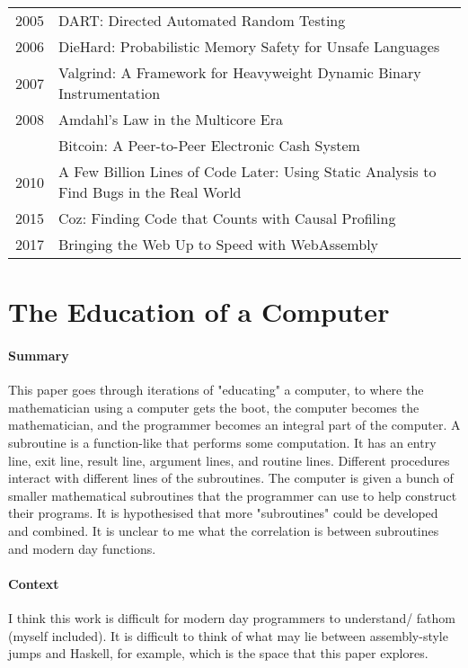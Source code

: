 {\begin{tabular}{r |@{\foo} l}
2005 & DART: Directed Automated Random Testing \cite{godefroid2005dart} \\
2006 & DieHard: Probabilistic Memory Safety for Unsafe Languages \cite{berger2006diehard} \\
2007 & Valgrind: A Framework for Heavyweight Dynamic Binary Instrumentation \cite{nethercote2007valgrind} \\
2008 & Amdahl’s Law in the Multicore Era \cite{hill2008amdahl} \\
     & Bitcoin: A Peer-to-Peer Electronic Cash System \cite{nakamoto2008bitcoin} \\
2010 & A Few Billion Lines of Code Later: Using Static Analysis to Find Bugs in the Real World \cite{bessey2010few} \\
2015 & Coz: Finding Code that Counts with Causal Profiling \cite{curtsinger2015c} \\
2017 & Bringing the Web Up to Speed with WebAssembly \cite{haas2017bringing} \\

\end{tabular}
}

\section {The Education of a Computer \cite{hopper1952education}}

\paragraph{\textbf{Summary}}
This paper goes through iterations of "educating" a computer, to where the
mathematician using a computer gets the boot, the computer becomes the
mathematician, and the programmer becomes an integral part of the computer. A
subroutine is a function-like that performs some computation. It has an entry
line, exit line, result line, argument lines, and routine lines. Different
procedures interact with different lines of the subroutines. The computer is
given a bunch of smaller mathematical subroutines that the programmer can use to
help construct their programs. It is hypothesised that more "subroutines" could
be developed and combined. It is unclear to me what the correlation is between
subroutines and modern day functions.
\paragraph{\textbf{Context}}
I think this work is difficult for modern day programmers to understand/ fathom
(myself included). It is difficult to think of what may lie between
assembly-style jumps and Haskell, for example, which is the space that this
paper explores.

